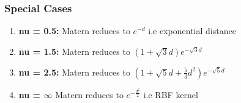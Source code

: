 \documentclass[hidelinks]{book}
\numberwithin{equation}{section}
\begin{document}
\subsubsection{Special Cases}
\begin{enumerate}
  \item \textbf{nu = 0.5:} Matern reduces to $e^{-d}$ i.e exponential distance
  \item \textbf{nu = 1.5:} Matern reduces to $(1+ \sqrt3 d) e^{-\sqrt3 d}$
  \item \textbf{nu = 2.5:} Matern reduces to $(1+ \sqrt5 d + \frac{5}{3} d^2) e^{-\sqrt5 d}$
  \item \textbf{nu = $\infty$} Matern reduces to $e^{-\frac{d^2}{2}}$ i.e RBF
    kernel
\end{enumerate}
\end{document}
